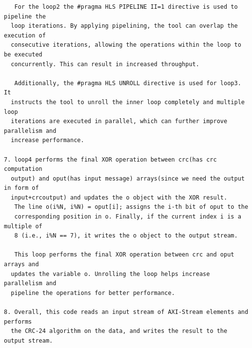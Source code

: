 \documentclass{article}
\begin{document}
\begin{lstlisting}
   For the loop2 the #pragma HLS PIPELINE II=1 directive is used to pipeline the 
  loop iterations. By applying pipelining, the tool can overlap the execution of 
  consecutive iterations, allowing the operations within the loop to be executed 
  concurrently. This can result in increased throughput.
  
   Additionally, the #pragma HLS UNROLL directive is used for loop3. It  
  instructs the tool to unroll the inner loop completely and multiple loop 
  iterations are executed in parallel, which can further improve parallelism and 
  increase performance.

7. loop4 performs the final XOR operation between crc(has crc computation 
  output) and oput(has input message) arrays(since we need the output in form of 
  input+crcoutput) and updates the o object with the XOR result.
   The line o(i%N, i%N) = oput[i]; assigns the i-th bit of oput to the 
   corresponding position in o. Finally, if the current index i is a multiple of
   8 (i.e., i%N == 7), it writes the o object to the output stream.

   This loop performs the final XOR operation between crc and oput arrays and 
  updates the variable o. Unrolling the loop helps increase parallelism and 
  pipeline the operations for better performance.

8. Overall, this code reads an input stream of AXI-Stream elements and performs
  the CRC-24 algorithm on the data, and writes the result to the output stream.

\end{lstlisting}
\vspace{13cm}
\end{document}
